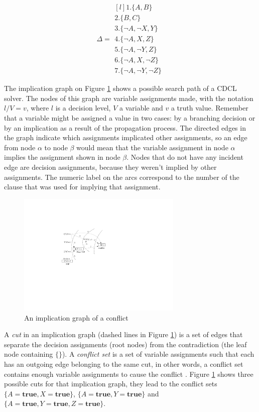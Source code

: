\documentclass[12pt]{diicc}
\begin{document}
\begin{equation}\label{row sum}
\Delta = \begin{matrix*}[l]
			1.\{A,B\}\\
		 	2.\{B,C\}\\
		 	3.\{\neg A,\neg X,Y\}\\
		 	4.\{\neg A,X,Z\}\\
		 	5.\{\neg A,\neg Y,Z\}\\
		 	6.\{\neg A,X,\neg Z\}\\
		 	7.\{\neg A,\neg Y,\neg Z\}
		 \end{matrix*}
\end{equation}

The implication graph on Figure \ref{fig:uip} shows a possible search path of a CDCL solver. The nodes of this graph are variable assignments made, with the notation $l/V=v$, where $l$ is a decision level, $V$ a variable and $v$ a truth value. Remember that a variable might be assigned a value in two cases: by a branching decision or by an implication as a result of the propagation process. The directed edges in the graph indicate which assignments implicated other assignments, so an edge from node $\alpha$ to node $\beta$ would mean that the variable assignment in node $\alpha$ implies the assignment shown in node $\beta$. Nodes that do not have any incident edge are decision assignments, because they weren't implied by other assignments. The numeric label on the arcs correspond to the number of the clause that was used for implying that assignment. 

\begin{figure}[h!]
	\centering
		\includegraphics[width=0.7\textwidth]{uip}
	\caption{An implication graph of a conflict}
	\label{fig:uip}
\end{figure}

A \textit{cut} in an implication graph (dashed lines in Figure \ref{fig:uip}) is a set of edges that separate the decision assignments (root nodes) from the contradiction (the leaf node containing $\{\}$). A \textit{conflict set} is a set of variable assignments such that each has an outgoing edge belonging to the same cut, in other words, a conflict set contains enough variable assignments to cause the conflict \cite{grasp,cdcl1,ig}. Figure \ref{fig:uip} shows three possible cuts for that implication graph, they lead to the conflict sets $\{A=\textbf{true},X=\textbf{true}\}$, $\{A=\textbf{true},Y=\textbf{true}\}$ and $\{A=\textbf{true},Y=\textbf{true},Z=\textbf{true}\}$.
\end{document}
